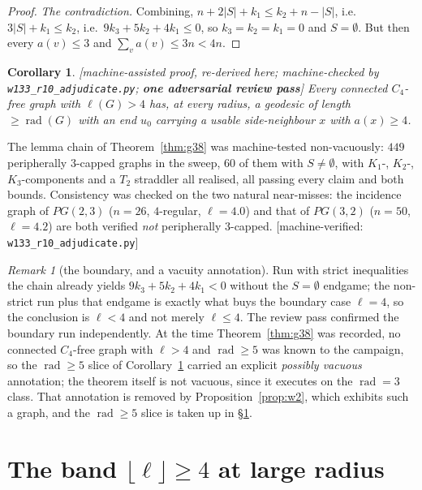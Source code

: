\documentclass[11pt]{article}
\theoremstyle{plain}
\newtheorem{corollary}[theorem]{Corollary}
\theoremstyle{definition}
\theoremstyle{remark}
\newtheorem{remark}[theorem]{Remark}
\numberwithin{equation}{section}
\newcommand{\rad}{\operatorname{rad}}
\newcommand{\statusbox}[1]{{\small\sloppy\textsf{[#1]}}}
\newcommand{\AD}[1]{\statusbox{machine-assisted proof, re-derived here;
machine-checked by \texttt{#1}; \textbf{one adversarial review pass}}}
\newcommand{\MV}[1]{\statusbox{machine-verified: \texttt{#1}}}
\begin{document}
\begin{proof}
\emph{The contradiction.} Combining, $n+2|S|+k_1 \le k_2+n-|S|$, i.e.\
$3|S| + k_1 \le k_2$, i.e.\ $9k_3+5k_2+4k_1\le 0$, so $k_3=k_2=k_1=0$ and $S = \emptyset$.
But then every $a(v)\le 3$ and $\sum_v a(v)\le 3n < 4n$.
\end{proof}

\begin{corollary}\label{cor:g38}
\AD{w133\_r10\_adjudicate.py}
Every connected $C_4$-free graph with $\ell(G) > 4$ has, at \emph{every} radius, a geodesic
of length $\ge \rad(G)$ with an end $u_0$ carrying a usable side-neighbour $x$ with
$a(x)\ge 4$.
\end{corollary}

The lemma chain of Theorem~\ref{thm:g38} was machine-tested non-vacuously: $449$ peripherally
$3$-capped graphs in the sweep, $60$ of them with $S \ne \emptyset$, with $K_1$-, $K_2$-,
$K_3$-components and a $T_2$ straddler all realised, all passing every claim and both bounds.
Consistency was checked on the two natural near-misses: the incidence graph of $PG(2,3)$
($n = 26$, $4$-regular, $\ell = 4.0$) and that of $PG(3,2)$ ($n = 50$, $\ell = 4.2$) are both
verified \emph{not} peripherally $3$-capped. \MV{w133\_r10\_adjudicate.py}

\begin{remark}[the boundary, and a vacuity annotation]
Run with strict inequalities the chain already yields $9k_3+5k_2+4k_1 < 0$ without the
$S = \emptyset$ endgame; the non-strict run plus that endgame is exactly what buys the
boundary case $\ell = 4$, so the conclusion is $\ell < 4$ and not merely $\ell \le 4$. The
review pass confirmed the boundary run independently. At the time Theorem~\ref{thm:g38} was
recorded, no connected $C_4$-free graph with $\ell > 4$ and $\rad \ge 5$ was known to the
campaign, so the $\rad \ge 5$ slice of Corollary~\ref{cor:g38} carried an explicit
\emph{possibly vacuous} annotation; the theorem itself is not vacuous, since it executes on
the $\rad = 3$ class. That annotation is removed by Proposition~\ref{prop:w2}, which exhibits
such a graph, and the $\rad \ge 5$ slice is taken up in \S\ref{sec:pocket2}.
\end{remark}

\section{The band $\lfloor \ell\rfloor \ge 4$ at large radius}\label{sec:pocket2}
\end{document}
